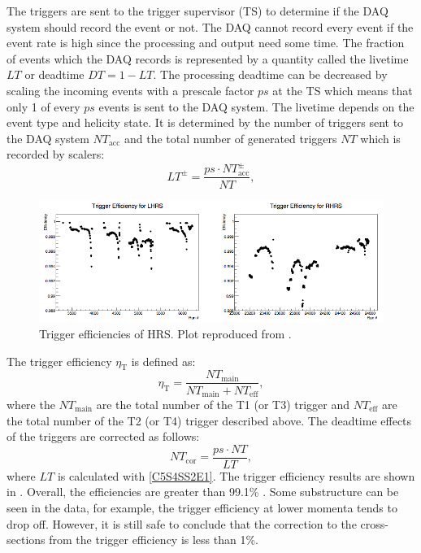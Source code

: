 The triggers are sent to the trigger supervisor (TS) to determine if the DAQ system should record the event or not. The DAQ cannot record every event if the event rate is high since the processing and output need some time. The fraction of events which the DAQ records is represented by a quantity called the livetime $LT$ or deadtime $DT=1-LT$. The processing deadtime can be decreased by scaling the incoming events with a prescale factor $ps$ at the TS which means that only 1 of every $ps$ events is sent to the DAQ system. The livetime depends on the event type and helicity state. It is determined by the number of triggers sent to the DAQ system $NT_{\mathrm{acc}}$ and the total number of generated triggers $NT$ which is recorded by scalers:
\begin{equation} \label{C5S4SS2E1}
LT^{\pm} = \frac{ps\cdot NT_{\mathrm{acc}}^{\pm}}{NT},
\end{equation}

\begin{figure}[tb!]
  \centering
  \includegraphics[width=\textwidth]{figs/trigger-efficiency.png}
  \caption[Trigger efficiencies of HRS.]{Trigger efficiencies of HRS. Plot reproduced from \cite{Zielinski2014a}. \label{C5S4SS2F3}}
\end{figure}

The trigger efficiency $\eta_{\mathrm{T}}$ is defined as:
\begin{equation} \label{C5S4SS2E2}
\eta_{\mathrm{T}} = \frac{NT_{\mathrm{main}}}{NT_{\mathrm{main}}+NT_{\mathrm{eff}}},
\end{equation}
where the $NT_{\mathrm{main}}$ are the total number of the T1 (or T3) trigger and $NT_{\mathrm{eff}}$ are the total number of the T2 (or T4) trigger described above. The deadtime effects of the triggers are corrected as follows:
\begin{equation} \label{C5S4SS2E3}
NT_{\mathrm{cor}} = \frac{ps\cdot NT}{LT},
\end{equation}
where $LT$ is calculated with \cref{C5S4SS2E1}. The trigger efficiency results are shown in . Overall, the efficiencies are greater than 99.1\% \cite{Zielinski2014a}. Some substructure can be seen in the data, for example, the trigger efficiency at lower momenta tends to drop off. However, it is still safe to conclude that the correction to the cross-sections from the trigger efficiency is less than 1\%.

